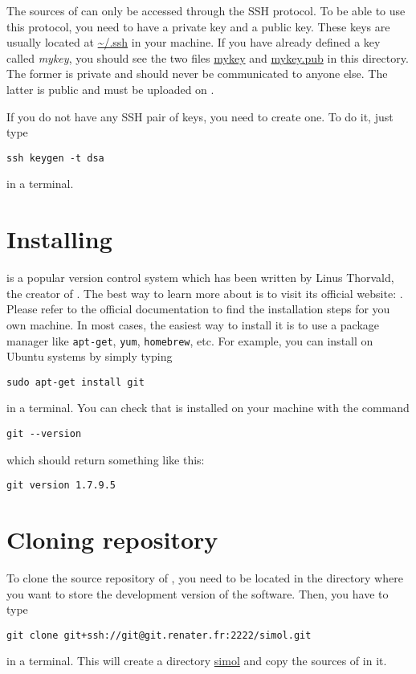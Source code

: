 The sources of \Simol can only be accessed through the SSH protocol. To be able to use this protocol, you need to have a private key and a public key. These keys are usually located at \url{~/.ssh} in your machine. If you have already defined a key called \textit{mykey}, you should see the two files \url{mykey} and \url{mykey.pub} in this directory. The former is private and should never be communicated to anyone else. The latter is public and must be uploaded on \SourceSup. 

If you do not have any SSH pair of keys, you need to create one. To do it, just type
\begin{verbatim}
ssh keygen -t dsa
\end{verbatim}
in a terminal.

\section{Installing \Git}


\Git is a popular version control system which has been written by Linus Thorvald, the creator of \Linux. The best way to learn more about \Git is to visit its official website: \urlGit. Please refer to the official documentation to find the installation steps for you own machine. In most cases, the easiest way to install it is to use a package manager like \texttt{apt-get}, \texttt{yum}, \texttt{homebrew}, etc. For example, you can install \Git on Ubuntu systems by simply typing
\begin{verbatim}
sudo apt-get install git
\end{verbatim}
in a terminal. You can check that \Git is installed on your machine with the command
\begin{verbatim}
git --version
\end{verbatim}
which should return something like this:
\begin{verbatim}
git version 1.7.9.5
\end{verbatim}

\section{Cloning \Simol repository}

To clone the source repository of \Simol, you need to be located in the directory where you want to store the development version of the software. Then, you have to type
\begin{verbatim}
git clone git+ssh://git@git.renater.fr:2222/simol.git
\end{verbatim}
in a terminal. This will create a directory \url{simol} and copy the sources of \Simol in it. 


